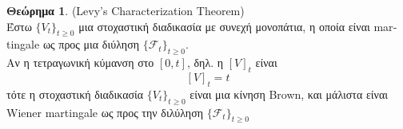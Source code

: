 \documentclass[12pt,a4paper]{article}
\theoremstyle{definition}
\numberwithin{equation}{section}
\newtheorem{theorima}{Θεώρημα}
\begin{document}
\begin{theorima}\textlatin{(Levy's Characterization Theorem)}\\
Έστω $\{V_t\}_{t\geq 0}$ μια στοχαστική διαδικασία με συνεχή μονοπάτια, η οποία είναι \textlatin{martingale} ως προς μια διύληση $\{\mathcal{F}_t\}_{t\geq 0}$.\\
Αν η τετραγωνική κύμανση στο $[0,t]$, δηλ. η $[ V ]_t$ είναι
$$[ V ]_t = t $$
τότε η στοχαστική διαδικασία $\{V_t\}_{t\geq 0}$ είναι μια κίνηση \textlatin{Brown}, και μάλιστα είναι \textlatin{Wiener martingale} ως προς την διλύληση $\{ \mathcal{F}_t\}_{t\geq 0}$
\end{theorima}
\end{document}
